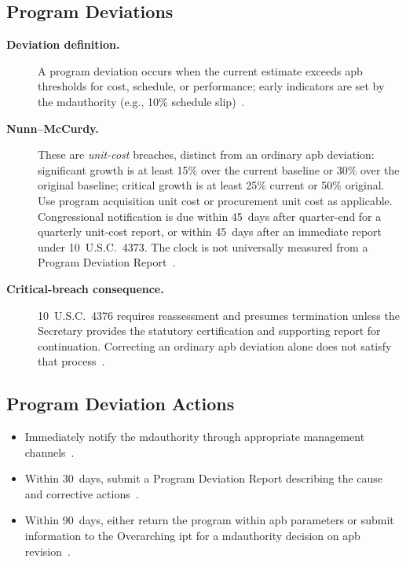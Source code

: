\documentclass[../main.tex]{subfiles}
\begin{document}
\subsection{Program Deviations}
\begin{description}
  \item[\textbf{Deviation definition.}] A program deviation occurs when the current estimate exceeds \ac{apb} thresholds for cost, schedule, or performance; early indicators are set by the \ac{mdauthority} (e.g., 10\% schedule slip)~\autocite{DoDI5000-85,edo-3-3-2-acq-milestones-phases-2025}.
  \item[\textbf{Nunn--McCurdy.}] These are \emph{unit-cost} breaches, distinct from an ordinary \ac{apb} deviation: significant growth is at least 15\% over the current baseline or 30\% over the original baseline; critical growth is at least 25\% current or 50\% original. Use program acquisition unit cost or procurement unit cost as applicable. Congressional notification is due within 45~days after quarter-end for a quarterly unit-cost report, or within 45~days after an immediate report under 10~U.S.C.\ 4373. The clock is not universally measured from a Program Deviation Report~\autocite{USC-4371-NunnMcCurdy,USC-10-4374}.
  \item[\textbf{Critical-breach consequence.}] 10~U.S.C.\ 4376 requires reassessment and presumes termination unless the Secretary provides the statutory certification and supporting report for continuation. Correcting an ordinary \ac{apb} deviation alone does not satisfy that process~\autocite{USC-10-4376}.
\end{description}

\subsection{Program Deviation Actions}
\begin{itemize}
  \item Immediately notify the \ac{mdauthority} through appropriate management channels~\autocite{edo-3-3-2-acq-milestones-phases-2025}.
  \item Within 30~days, submit a Program Deviation Report describing the cause and corrective actions~\autocite{edo-3-3-2-acq-milestones-phases-2025}.
  \item Within 90~days, either return the program within \ac{apb} parameters or submit information to the Overarching \ac{ipt} for a \ac{mdauthority} decision on \ac{apb} revision~\autocite{edo-3-3-2-acq-milestones-phases-2025}.
\end{itemize}
\end{document}
